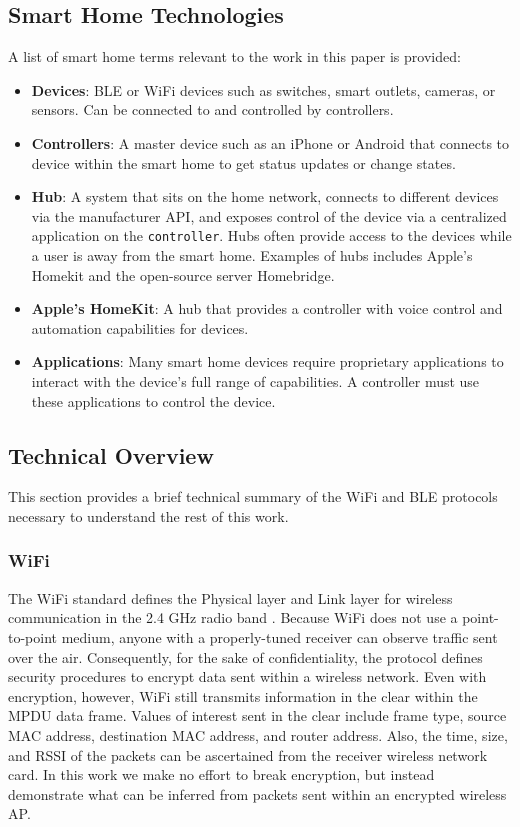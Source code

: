 \subsection{Smart Home Technologies}
A list of smart home terms relevant to the work in this paper is provided:
\begin{itemize}
\item\textbf{Devices}: \ac{BLE} or WiFi devices such as switches, smart outlets, cameras, or sensors. Can be connected to and controlled by controllers.
\item\textbf{Controllers}: A master device such as an iPhone or Android that connects to device within the smart home to get status updates or change states.
\item\textbf{Hub}: A system that sits on the home network, connects to different devices via the manufacturer \ac{API}, and exposes control of the device via a centralized application on the \texttt{controller}. Hubs often provide access to the devices while a user is away from the smart home. Examples of hubs includes Apple's Homekit and the open-source server Homebridge.
\item\textbf{Apple's HomeKit}: A hub that provides a controller with voice control and automation capabilities for devices.
\item\textbf{Applications}: Many smart home devices require proprietary applications to interact with the device's full range of capabilities. A controller must use these applications to control the device.
\end{itemize}

\subsection{Technical Overview}
This section provides a brief technical summary of the WiFi and \ac{BLE} protocols necessary to understand the rest of this work.

\subsubsection{WiFi}
The WiFi standard defines the Physical layer and Link layer for wireless communication in the 2.4 GHz radio band \cite{802.11}. Because WiFi does not use a point-to-point medium, anyone with a properly-tuned receiver can observe traffic sent over the air. Consequently, for the sake of confidentiality, the protocol defines security procedures to encrypt data sent within a wireless network. Even with encryption, however, WiFi still transmits information in the clear within the \ac{MPDU} data frame. Values of interest sent in the clear include frame type, source \ac{MAC} address, destination \ac{MAC} address, and router address. Also, the time, size, and \ac{RSSI} of the packets can be ascertained from the receiver wireless network card. In this work we make no effort to break encryption, but instead demonstrate what can be inferred from packets sent within an encrypted wireless \ac{AP}.


